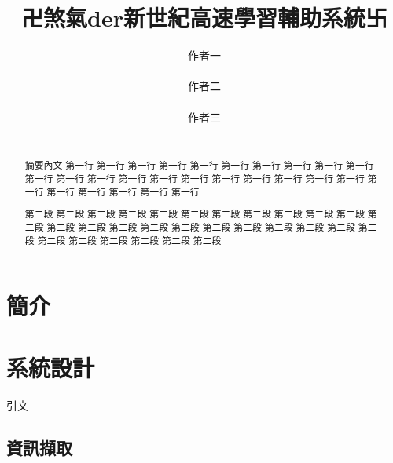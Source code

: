 \documentclass[twocolumn]{article}
\begin{document}
\title{卍煞氣der新世紀高速學習輔助系統卐}

\author{
\alignauthor 作者一 \\
       \\
\alignauthor 作者二 \\
       \\
\alignauthor 作者三\\
       \\
\and
}

\maketitle
\begin{abstract}
摘要內文 第一行  第一行  第一行  第一行  第一行  第一行  第一行  第一行
 第一行  第一行  第一行  第一行  第一行  第一行  第一行  第一行  第一行  第一行 
  第一行  第一行  第一行  第一行  第一行  第一行  第一行  第一行  第一行 

第二段 第二段 第二段 第二段 第二段 第二段 第二段 第二段 第二段 第二段 第二段 
第二段 第二段 第二段 第二段 第二段 第二段 第二段 第二段 第二段 第二段 第二段 
第二段 第二段 第二段 第二段 第二段 第二段 第二段 
\end{abstract}




\section{簡介}

\section{系統設計}
引文

\subsection{資訊擷取}
\end{document}
